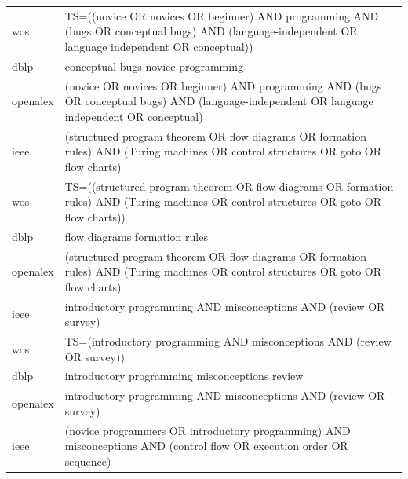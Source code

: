 \documentclass{article}
\begin{document}
\begin{longtable}{lp{10cm}}
wos & TS=((novice OR novices OR beginner) AND programming AND (bugs OR \textquotedbl{}conceptual bugs\textquotedbl{}) AND (\textquotedbl{}language-independent\textquotedbl{} OR \textquotedbl{}language independent\textquotedbl{} OR conceptual)) \\
dblp & conceptual bugs novice programming \\
openalex & (novice OR novices OR beginner) AND programming AND (bugs OR \textquotedbl{}conceptual bugs\textquotedbl{}) AND (\textquotedbl{}language-independent\textquotedbl{} OR \textquotedbl{}language independent\textquotedbl{} OR conceptual) \\
ieee & (\textquotedbl{}structured program theorem\textquotedbl{} OR \textquotedbl{}flow diagrams\textquotedbl{} OR \textquotedbl{}formation rules\textquotedbl{}) AND (\textquotedbl{}Turing machines\textquotedbl{} OR \textquotedbl{}control structures\textquotedbl{} OR goto OR \textquotedbl{}flow charts\textquotedbl{}) \\
wos & TS=((\textquotedbl{}structured program theorem\textquotedbl{} OR \textquotedbl{}flow diagrams\textquotedbl{} OR \textquotedbl{}formation rules\textquotedbl{}) AND (\textquotedbl{}Turing machines\textquotedbl{} OR \textquotedbl{}control structures\textquotedbl{} OR goto OR \textquotedbl{}flow charts\textquotedbl{})) \\
dblp & flow diagrams formation rules \\
openalex & (\textquotedbl{}structured program theorem\textquotedbl{} OR \textquotedbl{}flow diagrams\textquotedbl{} OR \textquotedbl{}formation rules\textquotedbl{}) AND (\textquotedbl{}Turing machines\textquotedbl{} OR \textquotedbl{}control structures\textquotedbl{} OR goto OR \textquotedbl{}flow charts\textquotedbl{}) \\
ieee & \textquotedbl{}introductory programming\textquotedbl{} AND misconceptions AND (review OR survey) \\
wos & TS=(\textquotedbl{}introductory programming\textquotedbl{} AND misconceptions AND (review OR survey)) \\
dblp & introductory programming misconceptions review \\
openalex & \textquotedbl{}introductory programming\textquotedbl{} AND misconceptions AND (review OR survey) \\
ieee & (\textquotedbl{}novice programmers\textquotedbl{} OR \textquotedbl{}introductory programming\textquotedbl{}) AND misconceptions AND (\textquotedbl{}control flow\textquotedbl{} OR \textquotedbl{}execution order\textquotedbl{} OR sequence) \\

\end{longtable}
\end{document}
